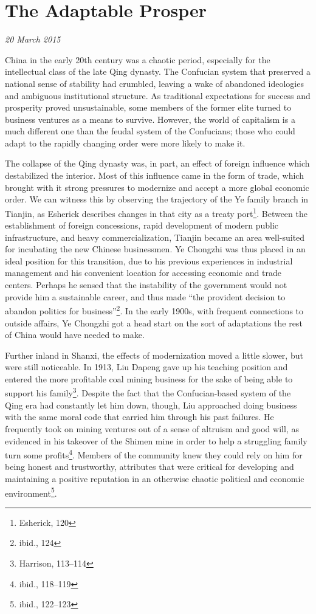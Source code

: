 \section{The Adaptable Prosper}

\textit{20 March 2015}

China in the early 20th century was a chaotic period, especially for the
intellectual class of the late Qing dynasty. The Confucian system that preserved
a national sense of stability had crumbled, leaving a wake of abandoned
ideologies and ambiguous institutional structure. As traditional expectations
for success and prosperity proved unsustainable, some members of the former
elite turned to business ventures as a means to survive. However, the world of
capitalism is a much different one than the feudal system of the Confucians;
those who could adapt to the rapidly changing order were more likely to make it.

The collapse of the Qing dynasty was, in part, an effect of foreign influence
which destabilized the interior. Most of this influence came in the form of
trade, which brought with it strong pressures to modernize and accept a more
global economic order. We can witness this by observing the trajectory of the Ye
family branch in Tianjin, as Esherick describes changes in that city as a treaty
port\footnote{Esherick, 120}. Between the establishment of foreign concessions,
rapid development of modern public infrastructure, and heavy commercialization,
Tianjin became an area well-suited for incubating the new Chinese businessmen.
Ye Chongzhi was thus placed in an ideal position for this transition, due to his
previous experiences in industrial management and his convenient location for
accessing economic and trade centers. Perhaps he sensed that the instability of
the government would not provide him a sustainable career, and thus made ``the
provident decision to abandon politics for business''\footnote{ibid., 124}. In
the early 1900s, with frequent connections to outside affairs, Ye Chongzhi got a
head start on the sort of adaptations the rest of China would have needed to
make.

Further inland in Shanxi, the effects of modernization moved a little slower,
but were still noticeable. In 1913, Liu Dapeng gave up his teaching position and
entered the more profitable coal mining business for the sake of being able to
support his family\footnote{Harrison, 113--114}. Despite the fact that the
Confucian-based system of the Qing era had constantly let him down, though, Liu
approached doing business with the same moral code that carried him through his
past failures. He frequently took on mining ventures out of a sense of altruism
and good will, as evidenced in his takeover of the Shimen mine in order to help
a struggling family turn some profits\footnote{ibid., 118--119}. Members of the
community knew they could rely on him for being honest and trustworthy,
attributes that were critical for developing and maintaining a positive
reputation in an otherwise chaotic political and economic
environment\footnote{ibid., 122--123}.

